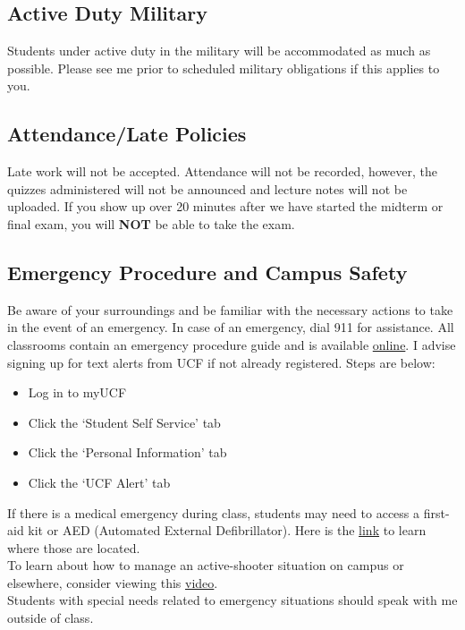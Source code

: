 \documentclass[11pt]{paper}
\begin{document}
\subsection{Active Duty Military}
Students under active duty in the military will be accommodated as much as possible. Please see me  prior to scheduled military obligations if this applies to you.
\subsection{Attendance/Late Policies}
Late work will not be accepted. Attendance will not be recorded, however, the quizzes administered will not be announced and lecture notes will not be uploaded. If you show up over 20 minutes after we have started the midterm or final exam, you will \textbf{NOT} be able to take the exam.
\subsection{Emergency Procedure and Campus Safety}
Be aware of your surroundings and be familiar with the necessary actions to take in the event of an emergency. In case of an emergency, dial 911 for assistance. All classrooms contain an emergency procedure guide and is available \href{http://emergency.ucf.edu/emergency_guide.html}{online}. I advise signing up for text alerts from UCF if not already registered. Steps are below:
\begin{itemize}
	\item Log in to myUCF
	\item Click the `Student Self Service' tab
	\item Click the `Personal Information' tab
	\item Click the `UCF Alert' tab
\end{itemize} 

If there is a medical emergency during class, students may need to access a
first-aid kit or AED (Automated External Defibrillator). Here is the \href{http://www.ehs.ucf.edu/AEDlocations-UCF}{link} to learn where those are located.\\

To learn about how to manage an active-shooter situation on campus or elsewhere, consider viewing this \href{https://www.youtube.com/watch?v=NIKYajEx4pk&feature=youtu.be}{video}.\\

Students with special needs related to emergency situations should speak with me outside of class.
\end{document}
